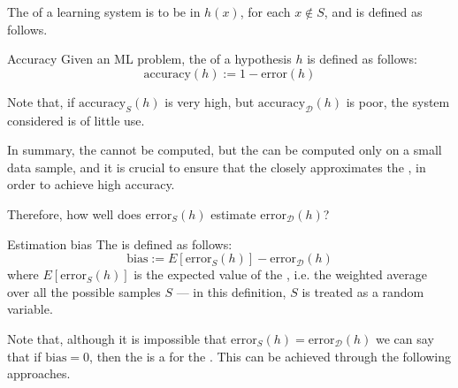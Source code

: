 \documentclass[a4paper, 12pt]{report}
\begin{document}
    The  of a learning system is to be  in $h(x)$, for each $x \notin S$, and  is defined as follows.

    \begin{frameddefn}{Accuracy}
        Given an ML problem, the  of a hypothesis $h$ is defined as follows: $$\mathrm{accuracy}(h) := 1 - \mathrm{error}(h)$$
    \end{frameddefn}

    Note that, if $\mathrm{accuracy}_S(h)$ is very high, but $\mathrm{accuracy}_\mathcal D(h)$ is poor, the system considered is of little use.

    In summary, the  cannot be computed, but the  can be computed only on a small data sample, and it is crucial to ensure that the  closely approximates the , in order to achieve high accuracy.

    Therefore, how well does $\mathrm{error}_S(h)$ estimate $\mathrm{error}_\mathcal D(h)$?

    \begin{frameddefn}{Estimation bias}
        The  is defined as follows: $$\mathrm{bias} := E[\mathrm{error}_S(h)] - \mathrm{error}_\mathcal D(h)$$ where $E[\mathrm{error}_S(h)]$ is the expected value of the , i.e. the weighted average over all the possible samples $S$ --- in this definition, $S$ is treated as a random variable.
    \end{frameddefn}

    Note that, although it is impossible that $\mathrm{error}_S(h) = \mathrm{error}_\mathcal D(h)$ we can say that if $\mathrm{bias} = 0$, then the  is a  for the . This can be achieved through the following approaches.
\end{document}
